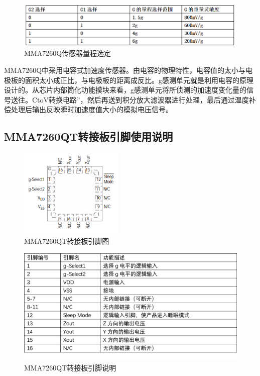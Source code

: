 \begin{figure}[H]
\centering
\includegraphics[width=14cm]{figure/lab2.1.2.png}
\caption{MMA7260Q传感器量程选定} \label{fig:2.1.2}
\end{figure}

\par{MMA7260Q中采用电容式加速度传感器。由电容的物理特性，电容值的太小与电极板的面积太小成正比，与电极板的距离成反比。g感测单元就是利用电容的原理设计的。从芯片内部筒化功能摸块来看，g感测单元将所侦测的加速度变化量的信号送往。CtoV转换电路”，然后再送到积分放大滤波器进行处理，最后通过温度补偿处理后输出反映瞬时加速度值大小的模拟电压信号。}

\subsection{MMA7260QT转接板引脚使用说明}

\begin{figure}[H]
\centering
\includegraphics[width=5cm]{figure/lab2.1.3.png}
\caption{MMA7260QT转接板引脚图} \label{fig:2.1.3}
\end{figure}

\begin{figure}[H]
\centering
\includegraphics[width=12cm]{figure/lab2.1.4.png}
\caption{MMA7260QT转接板引脚说明} \label{fig:2.1.4}
\end{figure}


